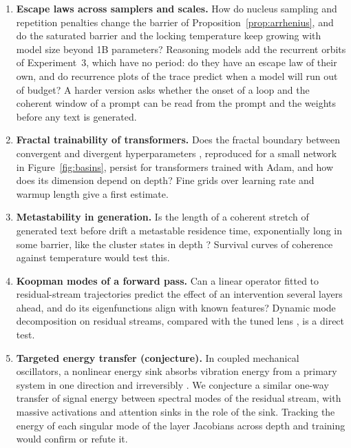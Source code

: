 \begin{enumerate}[label=\textbf{OP\,\arabic*.}, leftmargin=*, itemsep=3pt]
\item \textbf{Escape laws across samplers and scales.} How do nucleus sampling and repetition penalties change the barrier of Proposition~\ref{prop:arrhenius}, and do the saturated barrier and the locking temperature keep growing with model size beyond 1B parameters? Reasoning models add the recurrent orbits of Experiment~3, which have no period: do they have an escape law of their own, and do recurrence plots of the trace predict when a model will run out of budget? A harder version asks whether the onset of a loop and the coherent window of a prompt can be read from the prompt and the weights before any text is generated.

\item \textbf{Fractal trainability of transformers.} Does the fractal boundary between convergent and divergent hyperparameters \citep{sohldickstein2024boundary}, reproduced for a small network in Figure~\ref{fig:basins}, persist for transformers trained with Adam, and how does its dimension depend on depth? Fine grids over learning rate and warmup length give a first estimate.

\item \textbf{Metastability in generation.} Is the length of a coherent stretch of generated text before drift a metastable residence time, exponentially long in some barrier, like the cluster states in depth \citep{geshkovski2024dynamic}? Survival curves of coherence against temperature would test this.

\item \textbf{Koopman modes of a forward pass.} Can a linear operator fitted to residual-stream trajectories predict the effect of an intervention several layers ahead, and do its eigenfunctions align with known features? Dynamic mode decomposition on residual streams, compared with the tuned lens \citep{belrose2023eliciting}, is a direct test.

\item \textbf{Targeted energy transfer (conjecture).} In coupled mechanical oscillators, a nonlinear energy sink absorbs vibration energy from a primary system in one direction and irreversibly \citep{vakakis2009nonlinear,farid2016tuned}. We conjecture a similar one-way transfer of signal energy between spectral modes of the residual stream, with massive activations and attention sinks \citep{sun2024massive,xiao2023efficient} in the role of the sink. Tracking the energy of each singular mode of the layer Jacobians across depth and training would confirm or refute it.


\end{enumerate}
